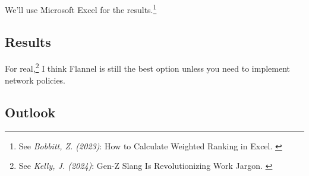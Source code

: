 We'll use Microsoft Excel for the results.\footnote{See \textit{Bobbitt, Z. (2023)}: How to Calculate Weighted Ranking in Excel. \cite{howtoWeigh}}

\subsection{Results}

For real,\footnote{See \textit{Kelly, J. (2024)}: Gen-Z Slang Is Revolutionizing Work Jargon. \cite{genzSlang}} I think Flannel is still the best option unless you need to implement network policies.

\subsection{Outlook}
